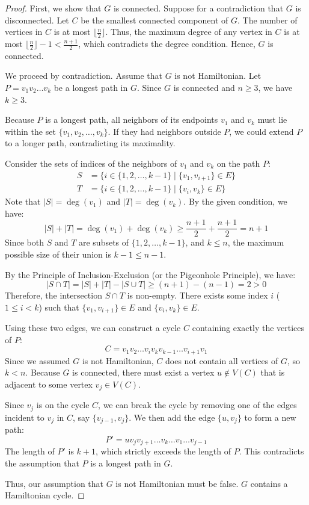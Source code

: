 \documentclass[11pt, a4paper]{ctexrep}
\begin{document}
\begin{proof}
    First, we show that $G$ is connected. Suppose for a contradiction that $G$ is disconnected. Let $C$ be the smallest connected component of $G$. The number of vertices in $C$ is at most $\lfloor \frac{n}{2} \rfloor$. Thus, the maximum degree of any vertex in $C$ is at most $\lfloor \frac{n}{2} \rfloor - 1 < \frac{n+1}{2}$, which contradicts the degree condition. Hence, $G$ is connected.

    We proceed by contradiction. Assume that $G$ is not Hamiltonian. Let $P = v_1 v_2 \dots v_k$ be a longest path in $G$. Since $G$ is connected and $n \ge 3$, we have $k \ge 3$.

    Because $P$ is a longest path, all neighbors of its endpoints $v_1$ and $v_k$ must lie within the set $\{v_1, v_2, \dots, v_k\}$. If they had neighbors outside $P$, we could extend $P$ to a longer path, contradicting its maximality.

    Consider the sets of indices of the neighbors of $v_1$ and $v_k$ on the path $P$:
    \begin{align*}
        S & = \{ i \in \{1, 2, \dots, k-1\} \mid \{v_1, v_{i+1}\} \in E \} \\
        T & = \{ i \in \{1, 2, \dots, k-1\} \mid \{v_i, v_k\} \in E \}
    \end{align*}
    Note that $|S| = \deg(v_1)$ and $|T| = \deg(v_k)$. By the given condition, we have:
    $$|S| + |T| = \deg(v_1) + \deg(v_k) \ge \frac{n+1}{2} + \frac{n+1}{2} = n + 1$$
    Since both $S$ and $T$ are subsets of $\{1, 2, \dots, k-1\}$, and $k \le n$, the maximum possible size of their union is $k - 1 \le n - 1$.

    By the Principle of Inclusion-Exclusion (or the Pigeonhole Principle), we have:
    $$|S \cap T| = |S| + |T| - |S \cup T| \ge (n + 1) - (n - 1) = 2 > 0$$
    Therefore, the intersection $S \cap T$ is non-empty. There exists some index $i$ ($1 \le i < k$) such that $\{v_1, v_{i+1}\} \in E$ and $\{v_i, v_k\} \in E$.

    Using these two edges, we can construct a cycle $C$ containing exactly the vertices of $P$:
    $$C = v_1 v_2 \dots v_i v_k v_{k-1} \dots v_{i+1} v_1$$
    Since we assumed $G$ is not Hamiltonian, $C$ does not contain all vertices of $G$, so $k < n$. Because $G$ is connected, there must exist a vertex $u \notin V(C)$ that is adjacent to some vertex $v_j \in V(C)$.

    Since $v_j$ is on the cycle $C$, we can break the cycle by removing one of the edges incident to $v_j$ in $C$, say $\{v_{j-1}, v_j\}$. We then add the edge $\{u, v_j\}$ to form a new path:
    $$P' = u v_j v_{j+1} \dots v_k \dots v_1 \dots v_{j-1}$$
    The length of $P'$ is $k+1$, which strictly exceeds the length of $P$. This contradicts the assumption that $P$ is a longest path in $G$.

    Thus, our assumption that $G$ is not Hamiltonian must be false. $G$ contains a Hamiltonian cycle.
\end{proof}
\end{document}
